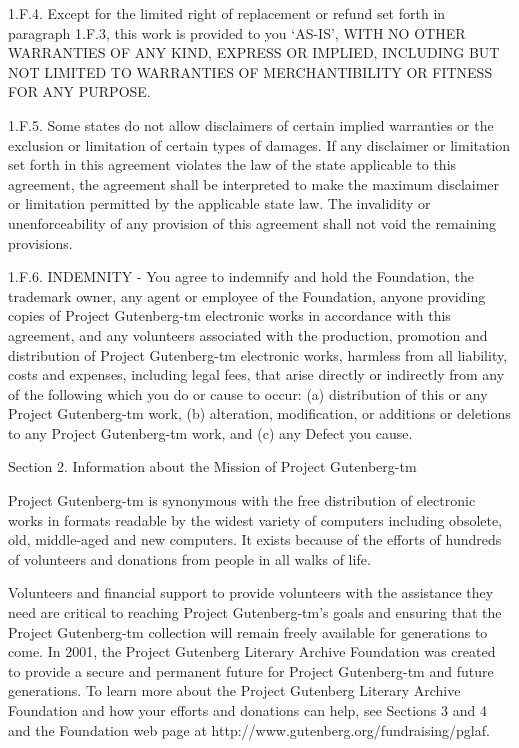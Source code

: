 \documentclass[12pt,oneside]{scrbook}
\begin{document}
  1.F.4. Except for the limited right of replacement or refund set forth
  in paragraph 1.F.3, this work is provided to you `AS-IS', WITH NO OTHER
  WARRANTIES OF ANY KIND, EXPRESS OR IMPLIED, INCLUDING BUT NOT LIMITED TO
  WARRANTIES OF MERCHANTIBILITY OR FITNESS FOR ANY PURPOSE.
  
  1.F.5. Some states do not allow disclaimers of certain implied
  warranties or the exclusion or limitation of certain types of damages.
  If any disclaimer or limitation set forth in this agreement violates the
  law of the state applicable to this agreement, the agreement shall be
  interpreted to make the maximum disclaimer or limitation permitted by
  the applicable state law. The invalidity or unenforceability of any
  provision of this agreement shall not void the remaining provisions.
  
  1.F.6. INDEMNITY - You agree to indemnify and hold the Foundation, the
  trademark owner, any agent or employee of the Foundation, anyone
  providing copies of Project Gutenberg-tm electronic works in accordance
  with this agreement, and any volunteers associated with the production,
  promotion and distribution of Project Gutenberg-tm electronic works,
  harmless from all liability, costs and expenses, including legal fees,
  that arise directly or indirectly from any of the following which you do
  or cause to occur: (a) distribution of this or any Project Gutenberg-tm
  work, (b) alteration, modification, or additions or deletions to any
  Project Gutenberg-tm work, and (c) any Defect you cause.
  
  Section 2. Information about the Mission of Project Gutenberg-tm
  
  Project Gutenberg-tm is synonymous with the free distribution of
  electronic works in formats readable by the widest variety of computers
  including obsolete, old, middle-aged and new computers. It exists
  because of the efforts of hundreds of volunteers and donations from
  people in all walks of life.
  
  Volunteers and financial support to provide volunteers with the
  assistance they need are critical to reaching Project Gutenberg-tm's
  goals and ensuring that the Project Gutenberg-tm collection will remain
  freely available for generations to come. In 2001, the Project Gutenberg
  Literary Archive Foundation was created to provide a secure and
  permanent future for Project Gutenberg-tm and future generations. To
  learn more about the Project Gutenberg Literary Archive Foundation and
  how your efforts and donations can help, see Sections 3 and 4 and the
  Foundation web page at http://www.gutenberg.org/fundraising/pglaf.
  
\end{document}
